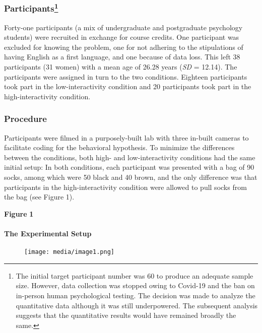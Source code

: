 \documentclass{article}
\begin{document}
\subsubsection{Participants\footnote{The initial target participant number was 60 to produce an adequate sample size. However, data collection was stopped owing to Covid-19 and the ban on in-person human psychological testing. The decision was made to analyze the quantitative data although it was still underpowered. The subsequent analysis suggests that the quantitative results would have remained broadly the same. 

}}

Forty-one participants (a mix of undergraduate and postgraduate psychology students) were recruited in exchange for course credits. One participant was excluded for knowing the problem, one for not adhering to the stipulations of having English as a first language, and one because of data loss. This left 38 participants (31 women) with a mean age of 26.28 years (\emph{SD} = 12.14). The participants were assigned in turn to the two conditions. Eighteen participants took part in the low-interactivity condition and 20 participants took part in the high-interactivity condition. 

\subsubsection{Procedure}

Participants were filmed in a purposely-built lab with three in-built cameras to facilitate coding for the behavioral hypothesis. To minimize the differences between the conditions, both high- and low-interactivity conditions had the same initial setup: In both conditions, each participant was presented with a bag of 90 socks, among which were 50 black and 40 brown, and the only difference was that participants in the high-interactivity condition were allowed to pull socks from the bag (see Figure 1). 

\textbf{Figure }\textbf{1}

\paragraph{The Experimental Setup }


\begin{figure}

  \texttt{[image: media/image1.png]}
\caption{}
\label{}


\end{figure}
\end{document}
